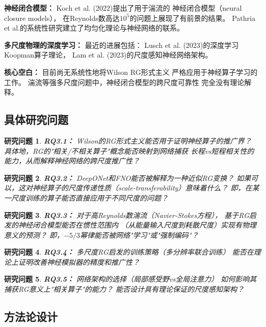 \documentclass[12pt,a4paper,twoside]{article}
\newtheorem{researchq}{研究问题}[section]
\begin{document}
\begin{inversation}
\textbf{神经闭合模型：} Koch et al. (2022)提出了用于湍流的
神经闭合模型（neural closure models），
在Reynolds数高达$10^5$的问题上展现了有前景的结果。
Pathria et al.的系统性研究建立了均匀化理论与神经网络的联系。

\textbf{多尺度物理的深度学习：} 最近的进展包括：
Lusch et al. (2023)的深度学习Koopman算子理论，
Lam et al. (2023)的尺度感知神经网络架构。

\textbf{核心空白：}
目前尚无系统性地将Wilson RG形式主义
严格应用于神经算子学习的工作。
湍流等强多尺度问题中，神经闭合模型的跨尺度可靠性
完全没有理论解释。

\subsection{具体研究问题}

\begin{researchq}
\textbf{RQ3.1：} Wilson的RG形式主义能否用于证明神经算子的推广界？
具体地，RG的"相关/不相关算子"概念能否映射到网络捕获
长程vs短程相关性的能力，从而解释神经网络的跨尺度推广性？
\end{researchq}

\begin{researchq}
\textbf{RQ3.2：} DeepONet和FNO能否被解释为一种近似RG变换？
如果可以，这对神经算子的尺度传递性质（scale-transferability）意味着什么？
即，在某一尺度训练的算子能否直接应用于不同尺度的问题？
\end{researchq}

\begin{researchq}
\textbf{RQ3.3：} 对于高Reynolds数湍流（Navier-Stokes方程），
基于RG启发的神经闭合模型能否在惯性范围内
（从能量输入尺度到耗散尺度）实现有物理意义的预测？
即，$-5/3$幂律能否被网络"学习"或"强制编码"？
\end{researchq}

\begin{researchq}
\textbf{RQ3.4：} 多尺度RG启发的训练策略（多分辨率联合训练）
能否在理论上证明改善神经模拟器的精度和推广性？
\end{researchq}

\begin{researchq}
\textbf{RQ3.5：} 网络架构的选择（局部感受野vs全局注意力）
如何影响其捕获RG意义上"相关算子"的能力？
能否设计具有理论保证的尺度感知架构？
\end{researchq}

\subsection{方法论设计}


\end{inversation}
\end{document}
